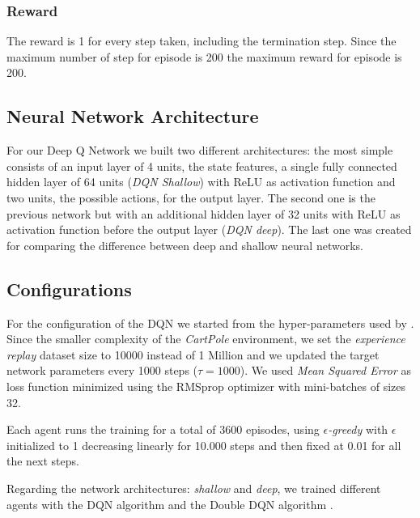 \subsubsection{Reward}
The reward is 1 for every step taken, including the termination step. Since the maximum number of step for episode is 200 the maximum reward for episode is 200.


\subsection{Neural Network Architecture}

For our Deep Q Network we built two different architectures: the most simple consists of an input layer of 4 units, the state features, a single fully connected hidden layer of 64 units (\textit{DQN Shallow}) with ReLU as activation function and two units, the possible actions, for the output layer. The second one is the previous network but with an additional hidden layer of 32 units with ReLU as activation function before the output layer (\textit{DQN deep}). %
The last one was created for comparing the difference between deep and shallow neural networks.

\subsection{Configurations}

For the configuration of the DQN we started from the hyper-parameters used by \citeauthor{Hasselt:2016:DRL:3016100.3016191} . Since the smaller complexity of the \textit{CartPole} environment, we set the \textit{experience replay} dataset size  to 10000 instead of 1 Million and we updated the target network parameters every 1000 steps ($\tau = 1000$). We used \textit{Mean Squared Error} as loss function minimized using the RMSprop optimizer with mini-batches of sizes 32.

Each agent runs the training for a total of 3600 episodes, using \textit{$\epsilon$-greedy} with $\epsilon$ initialized to 1 decreasing linearly for 10.000 steps and then fixed at 0.01 for all the next steps.

Regarding the network architectures: \textit{shallow} and \textit{deep}, we trained different agents with the DQN algorithm \cite{Mnih2015} and the Double DQN algorithm \cite{Hasselt:2016:DRL:3016100.3016191}.

